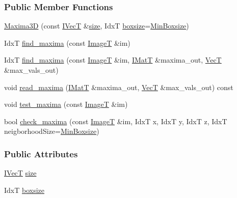 \subsubsection*{Public Member Functions}
\begin{DoxyCompactItemize}
\item 
\hyperlink{classboxxer_1_1Maxima3D_abec4b44770198fd079c0c84a8e418ec9}{Maxima3D} (const \hyperlink{classboxxer_1_1Maxima3D_a5fee3acd26edc152ba90e90812e40c1f}{I\+VecT} \&\hyperlink{classboxxer_1_1Maxima3D_a71f401fe66798eeeb8581faa5f9e0927}{size}, IdxT \hyperlink{classboxxer_1_1Maxima3D_a2902bed080ed07e6409e540f0bb82c34}{boxsize}=\hyperlink{classboxxer_1_1Maxima3D_a31e443fae0ba2fec7cdaebee0d207f31}{Min\+Boxsize})
\item 
IdxT \hyperlink{classboxxer_1_1Maxima3D_ad30559dd64e36cad467d0faa7e3db33c}{find\+\_\+maxima} (const \hyperlink{classboxxer_1_1Maxima3D_aebf2125d25bccd44361a369831600569}{ImageT} \&im)
\item 
IdxT \hyperlink{classboxxer_1_1Maxima3D_ad4ad309b255fc5b04730a8c40d068473}{find\+\_\+maxima} (const \hyperlink{classboxxer_1_1Maxima3D_aebf2125d25bccd44361a369831600569}{ImageT} \&im, \hyperlink{classboxxer_1_1Maxima3D_a51dcfe38a24fa1264aabbc4369d795bb}{I\+MatT} \&maxima\+\_\+out, \hyperlink{classboxxer_1_1Maxima3D_a3b589b4792d6446b7418a565314b126b}{VecT} \&max\+\_\+vals\+\_\+out)
\item 
void \hyperlink{classboxxer_1_1Maxima3D_a3a2f1e54987e235f59e2f1c1af5b2614}{read\+\_\+maxima} (\hyperlink{classboxxer_1_1Maxima3D_a51dcfe38a24fa1264aabbc4369d795bb}{I\+MatT} \&maxima\+\_\+out, \hyperlink{classboxxer_1_1Maxima3D_a3b589b4792d6446b7418a565314b126b}{VecT} \&max\+\_\+vals\+\_\+out) const 
\item 
void \hyperlink{classboxxer_1_1Maxima3D_a1057e4adf9dbb6410bc246648ae7d4bb}{test\+\_\+maxima} (const \hyperlink{classboxxer_1_1Maxima3D_aebf2125d25bccd44361a369831600569}{ImageT} \&im)
\item 
bool \hyperlink{classboxxer_1_1Maxima3D_ae01e8a792ba04cefd5d8abbaf40bb669}{check\+\_\+maxima} (const \hyperlink{classboxxer_1_1Maxima3D_aebf2125d25bccd44361a369831600569}{ImageT} \&im, IdxT x, IdxT y, IdxT z, IdxT neigborhood\+Size=\hyperlink{classboxxer_1_1Maxima3D_a31e443fae0ba2fec7cdaebee0d207f31}{Min\+Boxsize})
\end{DoxyCompactItemize}
\subsubsection*{Public Attributes}
\begin{DoxyCompactItemize}
\item 
\hyperlink{classboxxer_1_1Maxima3D_a5fee3acd26edc152ba90e90812e40c1f}{I\+VecT} \hyperlink{classboxxer_1_1Maxima3D_a71f401fe66798eeeb8581faa5f9e0927}{size}
\item 
IdxT \hyperlink{classboxxer_1_1Maxima3D_a2902bed080ed07e6409e540f0bb82c34}{boxsize}
\end{DoxyCompactItemize}
